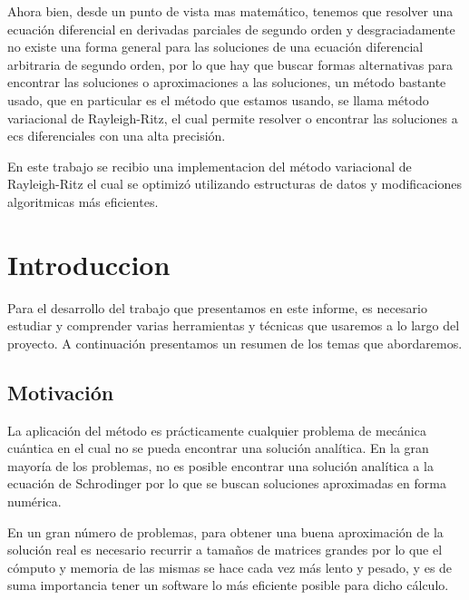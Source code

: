 \documentclass[a4paper,openright,12pt, oneside]{book}
\begin{document}
Ahora bien, desde un punto de vista mas matem\'atico, tenemos que resolver una ecuaci\'on diferencial 
en derivadas parciales de segundo orden y desgraciadamente no existe una forma general para 
las soluciones de una ecuaci\'on diferencial arbitraria de segundo orden, por lo que hay que buscar formas 
alternativas para encontrar las soluciones o aproximaciones a las soluciones, un m\'etodo bastante 
usado, que en particular es el m\'etodo que estamos usando, se llama m\'etodo variacional de 
Rayleigh-Ritz, el cual permite resolver o encontrar las soluciones a ecs diferenciales con una alta 
precisi\'on. 

En este trabajo se recibio una implementacion \cite{HE_EFERICO} del m\'etodo variacional de Rayleigh-Ritz el cual se optimiz\'o utilizando estructuras de datos y modificaciones algoritmicas m\'as eficientes.

\tableofcontents %

\setcounter{chapter}{1}
\chapter*{Introduccion}\label{Introduccion}
\markboth{}{} %

Para el desarrollo del trabajo que presentamos en este informe, es necesario estudiar y comprender varias herramientas y t\'ecnicas que usaremos a lo largo del proyecto. A continuaci\'on presentamos un resumen de los temas que abordaremos.

\section{Motivaci\'on}

La aplicaci\'on del m\'etodo es pr\'acticamente cualquier problema de mec\'anica cu\'antica en el 
cual no se pueda encontrar una soluci\'on anal\'itica.
En la gran mayor\'ia de los problemas, no es posible encontrar una soluci\'on anal\'itica a la ecuaci\'on de Schrodinger por lo que se buscan soluciones aproximadas en forma num\'erica.

En un gran n\'umero de problemas, para obtener una buena aproximaci\'on de la soluci\'on real es necesario recurrir a tama\~nos de matrices grandes por lo que el c\'omputo y memoria de las mismas se hace cada vez m\'as lento y pesado, y es de suma importancia tener un software lo m\'as eficiente posible para dicho c\'alculo. 
\end{document}
